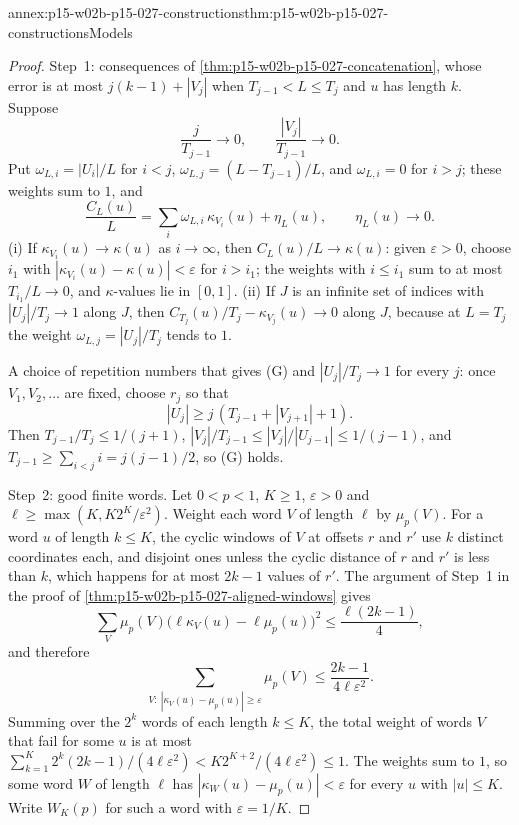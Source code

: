 \begin{annexitem}{annex:p15-w02b-p15-027-constructions}{thm:p15-w02b-p15-027-constructions}{Models}
\begin{proof}
Step~1: consequences of
\cref{thm:p15-w02b-p15-027-concatenation}, whose error is at most
\(j(k-1)+|V_j|\) when \(T_{j-1}<L\leq T_j\) and \(u\) has length \(k\).
Suppose
\[
 \frac{j}{T_{j-1}}\to0,\qquad\frac{|V_j|}{T_{j-1}}\to0. \tag{G}
\]
Put \(\omega_{L,i}=|U_i|/L\) for \(i<j\), \(\omega_{L,j}=(L-T_{j-1})/L\),
and \(\omega_{L,i}=0\) for \(i>j\); these weights sum to \(1\), and
\[
 \frac{C_L(u)}{L}=\sum_i\omega_{L,i}\,\kappa_{V_i}(u)+\eta_L(u),\qquad
 \eta_L(u)\to0 . \tag{W}
\]
(i) If \(\kappa_{V_i}(u)\to\kappa(u)\) as \(i\to\infty\), then
\(C_L(u)/L\to\kappa(u)\): given \(\varepsilon>0\), choose \(i_1\) with
\(|\kappa_{V_i}(u)-\kappa(u)|<\varepsilon\) for \(i>i_1\); the weights
with \(i\leq i_1\) sum to at most \(T_{i_1}/L\to0\), and \(\kappa\)-values
lie in \([0,1]\).
(ii) If \(J\) is an infinite set of indices with \(|U_j|/T_j\to1\) along
\(J\), then \(C_{T_j}(u)/T_j-\kappa_{V_j}(u)\to0\) along \(J\), because
at \(L=T_j\) the weight \(\omega_{L,j}=|U_j|/T_j\) tends to \(1\).

A choice of repetition numbers that gives (G) and \(|U_j|/T_j\to1\) for
every \(j\): once \(V_1,V_2,\ldots\) are fixed, choose \(r_j\) so that
\[
 |U_j|\geq j\,(T_{j-1}+|V_{j+1}|+1). \tag{R}
\]
Then \(T_{j-1}/T_j\leq1/(j+1)\), \(|V_j|/T_{j-1}\leq|V_j|/|U_{j-1}|\leq
1/(j-1)\), and \(T_{j-1}\geq\sum_{i<j}i=j(j-1)/2\), so (G) holds.

Step~2: good finite words. Let \(0<p<1\), \(K\geq1\), \(\varepsilon>0\)
and \(\ell\geq\max(K,K2^K/\varepsilon^2)\). Weight each word \(V\) of
length \(\ell\) by \(\mu_p(V)\). For a word \(u\) of length \(k\leq K\),
the cyclic windows of \(V\) at offsets \(r\) and \(r'\) use \(k\) distinct
coordinates each, and disjoint ones unless the cyclic distance of \(r\)
and \(r'\) is less than \(k\), which happens for at most \(2k-1\) values of
\(r'\). The argument of Step~1 in the proof of
\cref{thm:p15-w02b-p15-027-aligned-windows} gives
\[
 \sum_V\mu_p(V)\bigl(\ell\kappa_V(u)-\ell\mu_p(u)\bigr)^2\leq\frac{\ell(2k-1)}{4},
\]
and therefore
\[
 \sum_{V:\ |\kappa_V(u)-\mu_p(u)|\geq\varepsilon}\mu_p(V)\leq\frac{2k-1}{4\ell\varepsilon^2}.
\]
Summing over the \(2^k\) words of each length \(k\leq K\), the total
weight of words \(V\) that fail for some \(u\) is at most
\(\sum_{k=1}^K2^k(2k-1)/(4\ell\varepsilon^2)<K2^{K+2}/(4\ell\varepsilon^2)\leq1\).
The weights sum to \(1\), so some word \(W\) of length \(\ell\) has
\(|\kappa_W(u)-\mu_p(u)|<\varepsilon\) for every \(u\) with
\(|u|\leq K\). Write \(W_K(p)\) for such a word with \(\varepsilon=1/K\).


\end{proof}
\end{annexitem}
